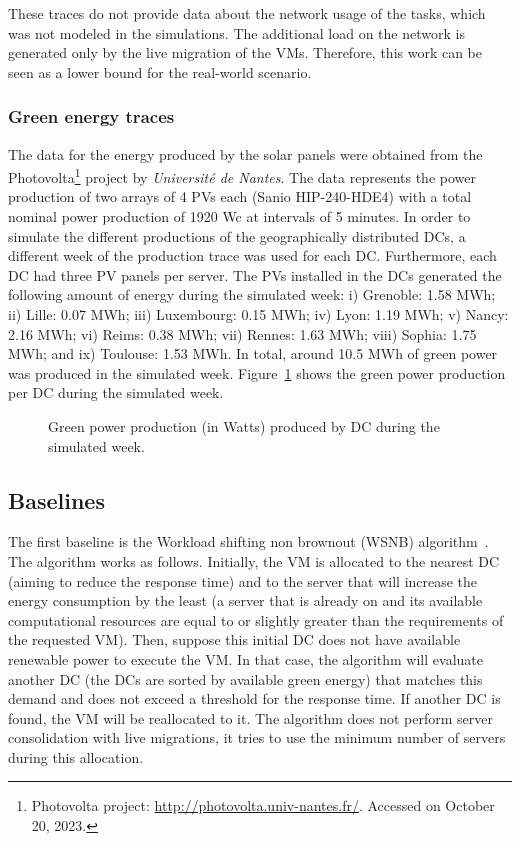 These traces do not provide data about the network usage of the tasks, which was not modeled in the simulations. The additional load on the network is generated only by the live migration of the VMs. Therefore, this work can be seen as a lower bound for the real-world scenario.


\subsubsection{Green energy traces}

The data for the energy produced by the solar panels were obtained from the Photovolta\footnote{Photovolta project: \url{http://photovolta.univ-nantes.fr/}. Accessed on October 20, 2023.} project by \textit{Université de Nantes}. The data represents the power production of two arrays of 4 PVs each (Sanio HIP-240-HDE4) with a total nominal power production of 1920 Wc at intervals of 5 minutes. In order to simulate the different productions of the geographically distributed DCs,  a different week of the production trace was used for each DC. Furthermore, each DC had three PV panels per server. The PVs installed in the DCs generated the following amount of energy during the simulated week: i) Grenoble: 1.58 MWh; ii) Lille: 0.07 MWh; iii) Luxembourg: 0.15 MWh; iv) Lyon: 1.19 MWh; v) Nancy: 2.16 MWh; vi) Reims: 0.38 MWh; vii) Rennes: 1.63 MWh; viii) Sophia: 1.75 MWh; and ix) Toulouse: 1.53 MWh. In total, around 10.5 MWh of green power was produced in the simulated week. Figure~\ref{fig:green_power} shows the green power production per DC during the simulated week.

 \begin{figure}[h]
  \centering
   {}
  \caption{Green power production (in Watts) produced by DC during the
  simulated week.}
  \label{fig:green_power}
\end{figure}


\subsection{Baselines}
\label{sec:baselines_smartgreens}

The first baseline is the Workload shifting non brownout (WSNB) algorithm~\cite{XU2020191}. The algorithm works as follows. Initially, the VM is allocated to the nearest DC (aiming to reduce the response time) and to the server that will increase the energy consumption by the least (a server that is already on and its available computational resources are equal to or slightly greater than the requirements of the requested VM). Then, suppose this initial DC does not have available renewable power to execute the VM. In that case, the algorithm will evaluate another DC (the DCs are sorted by available green energy) that matches this demand and does not exceed a threshold for the response time. If another DC is found, the VM will be reallocated to it. The algorithm does not perform server consolidation with live migrations, it tries to use the minimum number of servers during this allocation. 

